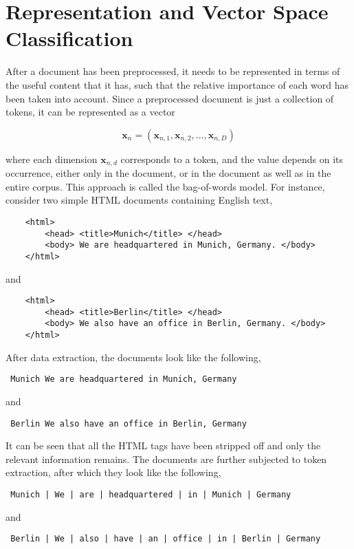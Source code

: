 \section{Representation and Vector Space Classification}
After a document has been preprocessed, it needs to be represented in terms of the useful content that it has, such that the relative importance of each word has been taken into account. Since a preprocessed document is just a collection of tokens, it can be represented as a vector

$$\mathbf{x}_{n} = (\mathbf{x}_{n, 1}, \mathbf{x}_{n, 2}, ... , \mathbf{x}_{n, D})$$

where each dimension $\mathbf{x}_{n, d}$ corresponds to a token, and the value depends on its occurrence, either only in the document, or in the document as well as in the entire corpus. This approach is called the bag-of-words model. For instance, consider two simple HTML documents containing English text,

\begin{center}
    \begin{verbatim}
    <html>
        <head> <title>Munich</title> </head>
        <body> We are headquartered in Munich, Germany. </body>
    </html>
    \end{verbatim}
    and
    \begin{verbatim}
    <html>
        <head> <title>Berlin</title> </head>
        <body> We also have an office in Berlin, Germany. </body>
    </html>
    \end{verbatim}
\end{center}

After data extraction, the documents look like the following,

\begin{center}
    \begin{verbatim} Munich We are headquartered in Munich, Germany \end{verbatim}
    and
    \begin{verbatim} Berlin We also have an office in Berlin, Germany \end{verbatim}
\end{center}

It can be seen that all the HTML tags have been stripped off and only the relevant information remains. The documents are further subjected to token extraction, after which they look like the following,

\begin{center}
    \begin{verbatim} Munich | We | are | headquartered | in | Munich | Germany \end{verbatim}
    and
    \begin{verbatim} Berlin | We | also | have | an | office | in | Berlin | Germany \end{verbatim}
\end{center}

